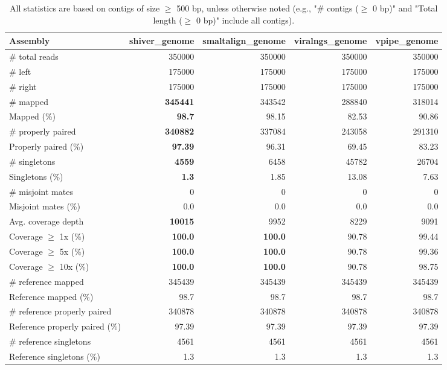 \documentclass[12pt,a4paper]{article}
\begin{document}
\begin{table}[ht]
\begin{center}
\caption{All statistics are based on contigs of size $\geq$ 500 bp, unless otherwise noted (e.g., "\# contigs ($\geq$ 0 bp)" and "Total length ($\geq$ 0 bp)" include all contigs).}
\begin{tabular}{|l*{4}{|r}|}
\hline
Assembly & shiver\_genome & smaltalign\_genome & viralngs\_genome & vpipe\_genome \\ \hline
\# total reads & 350000 & 350000 & 350000 & 350000 \\ \hline
\# left & 175000 & 175000 & 175000 & 175000 \\ \hline
\# right & 175000 & 175000 & 175000 & 175000 \\ \hline
\# mapped & {\bf 345441} & 343542 & 288840 & 318014 \\ \hline
Mapped (\%) & {\bf 98.7} & 98.15 & 82.53 & 90.86 \\ \hline
\# properly paired & {\bf 340882} & 337084 & 243058 & 291310 \\ \hline
Properly paired (\%) & {\bf 97.39} & 96.31 & 69.45 & 83.23 \\ \hline
\# singletons & {\bf 4559} & 6458 & 45782 & 26704 \\ \hline
Singletons (\%) & {\bf 1.3} & 1.85 & 13.08 & 7.63 \\ \hline
\# misjoint mates & 0 & 0 & 0 & 0 \\ \hline
Misjoint mates (\%) & 0.0 & 0.0 & 0.0 & 0.0 \\ \hline
Avg. coverage depth & {\bf 10015} & 9952 & 8229 & 9091 \\ \hline
Coverage $\geq$ 1x (\%) & {\bf 100.0} & {\bf 100.0} & 90.78 & 99.44 \\ \hline
Coverage $\geq$ 5x (\%) & {\bf 100.0} & {\bf 100.0} & 90.78 & 99.36 \\ \hline
Coverage $\geq$ 10x (\%) & {\bf 100.0} & {\bf 100.0} & 90.78 & 98.75 \\ \hline
\# reference mapped & 345439 & 345439 & 345439 & 345439 \\ \hline
Reference mapped (\%) & 98.7 & 98.7 & 98.7 & 98.7 \\ \hline
\# reference properly paired & 340878 & 340878 & 340878 & 340878 \\ \hline
Reference properly paired (\%) & 97.39 & 97.39 & 97.39 & 97.39 \\ \hline
\# reference singletons & 4561 & 4561 & 4561 & 4561 \\ \hline
Reference singletons (\%) & 1.3 & 1.3 & 1.3 & 1.3 \\ \hline

\end{tabular}
\end{center}
\end{table}
\end{document}

